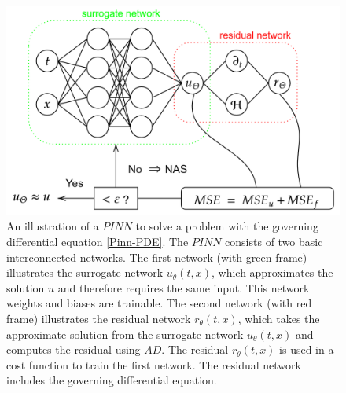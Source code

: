 \begin{figure}[H]
    \begin{center}
        \includegraphics[scale=0.3]{img/diagram-20220212.png}
    \end{center}
    \caption{An illustration of a $PINN$ to solve a problem with the governing differential equation \cref{Pinn-PDE}. The $PINN$ consists of two basic interconnected networks. The first network (with green frame) illustrates the surrogate network $u_\theta\left(t,x\right)$, which approximates the solution $u$ and therefore requires the same input. This network weights and biases are trainable. The second network (with red frame) illustrates the residual network $r_\theta\left(t,x\right)$, which takes the approximate solution from the surrogate network $u_\theta\left(t,x\right)$ and computes the residual using $AD$. The residual $r_\theta\left(t,x\right)$ is used in a cost function to train the first network. The residual network includes the governing differential equation.}
    \label{fig6}
\end{figure}

